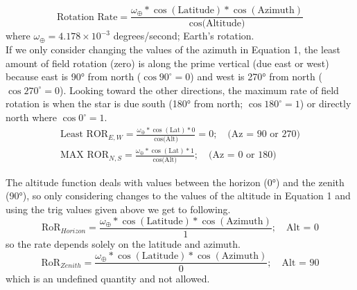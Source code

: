 \documentclass[a4paper,12pt]{extarticle}
\begin{document}
\begin{equation}
	\text{Rotation Rate}= \frac{\omega_\oplus \ast \cos(\text{Latitude}) \ast \cos(\text{Azimuth})}{\cos\text{(Altitude)}}
\end{equation}
where $\omega_\oplus=4.178 \times 10^{-3}$ degrees/second; Earth’s rotation. \\

If we only consider changing the values of the
azimuth in Equation 1, the least amount of field rotation (zero) is along the prime vertical (due east or west) because east is 90° from north ($\cos90^\circ=0$) and west is 270° from north ($\cos270^\circ=0$). Looking toward the other directions, the maximum rate of field rotation is when the star is due south (180° from north; $\cos180^\circ=1$) or directly north where $\cos0^\circ=1$.
\begin{gather*}
	\text{Least ROR}_{E,W}= \frac{\omega_\oplus \ast \cos(\text{Lat}) \ast 0}{\cos\text{(Alt)}}=0;\quad \text{(Az = 90 or 270)}\\
	\text{MAX ROR}_{N,S}= \frac{\omega_\oplus \ast \cos(\text{Lat}) \ast 1}{\cos\text{(Alt)}};\quad \text{(Az = 0 or 180)}
\end{gather*}

The altitude function deals with values between
the horizon (0°) and the zenith (90°), so only considering changes to the values of the altitude in Equation 1 and using the trig values given above we get to following.
\[\text{RoR}_{Horizon}= \frac{\omega_\oplus \ast \cos(\text{Latitude}) \ast \cos(\text{Azimuth})}{1}; \quad \text{Alt = 0}\]
so the rate depends solely on the latitude and azimuth.
\[	\text{RoR}_{Zenith}= \frac{\omega_\oplus \ast \cos(\text{Latitude}) \ast \cos(\text{Azimuth})}{0}; \quad \text{Alt = 90}\]
which is an undefined quantity and not allowed.


\clearpage
\end{document}
